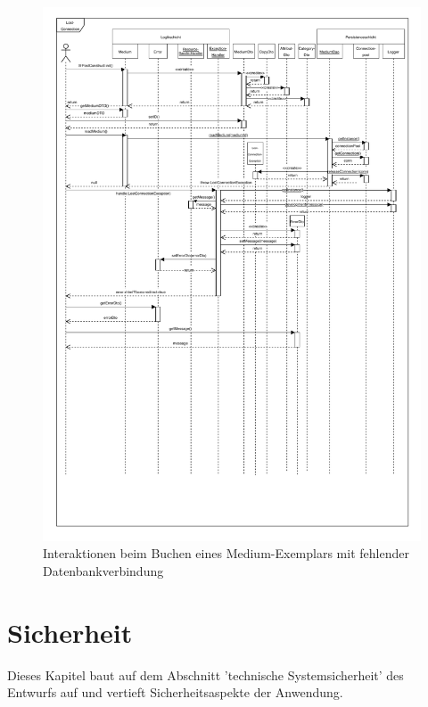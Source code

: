 \documentclass{article}
\begin{document}
\begin{figure}[h]
	\hypertarget{Fehlersequenz}{}
    \centering
    \includegraphics[width = 50em]{Sequenzdiagramm-exception-v5.0}
    \caption{Interaktionen beim Buchen eines Medium-Exemplars mit fehlender Datenbankverbindung}
    \label{Sequenzdiagramm}
\end{figure}

\restoregeometry
\newpage

\section{Sicherheit}
Dieses Kapitel baut auf dem Abschnitt 'technische Systemsicherheit' des Entwurfs auf und vertieft Sicherheitsaspekte der Anwendung.
\end{document}
